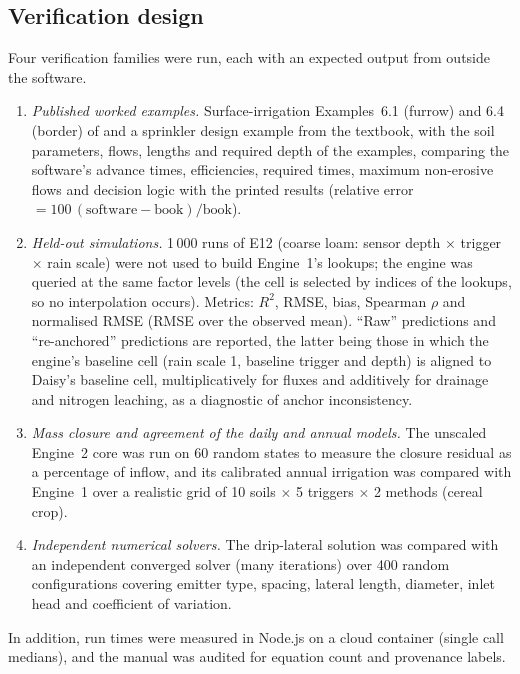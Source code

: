 \subsection{Verification design}
\label{sec:vermethods}
Four verification families were run, each with an expected output from outside the software.
\begin{enumerate}[nosep]
\item \emph{Published worked examples.} Surface-irrigation Examples~6.1 (furrow) and 6.4 (border) of \citet{Walker1987} and a sprinkler design example from the textbook, with the soil parameters, flows, lengths and required depth of the examples, comparing the software's advance times, efficiencies, required times, maximum non-erosive flows and decision logic with the printed results (relative error $=100\,(\mathrm{software}-\mathrm{book})/\mathrm{book}$).
\item \emph{Held-out simulations.} 1\,000 runs of E12 (coarse loam: sensor depth $\times$ trigger $\times$ rain scale) were not used to build Engine~1's lookups; the engine was queried at the same factor levels (the cell is selected by indices of the lookups, so no interpolation occurs). Metrics: $R^2$, RMSE, bias, Spearman $\rho$ and normalised RMSE (RMSE over the observed mean). ``Raw'' predictions and ``re-anchored'' predictions are reported, the latter being those in which the engine's baseline cell (rain scale 1, baseline trigger and depth) is aligned to Daisy's baseline cell, multiplicatively for fluxes and additively for drainage and nitrogen leaching, as a diagnostic of anchor inconsistency.
\item \emph{Mass closure and agreement of the daily and annual models.} The unscaled Engine~2 core was run on 60 random states to measure the closure residual as a percentage of inflow, and its calibrated annual irrigation was compared with Engine~1 over a realistic grid of 10 soils $\times$ 5 triggers $\times$ 2 methods (cereal crop).
\item \emph{Independent numerical solvers.} The drip-lateral solution was compared with an independent converged solver (many iterations) over 400 random configurations covering emitter type, spacing, lateral length, diameter, inlet head and coefficient of variation.
\end{enumerate}
In addition, run times were measured in Node.js on a cloud container (single call medians), and the manual was audited for equation count and provenance labels.



